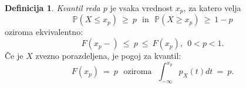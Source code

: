 \documentclass[11pt]{article}
\theoremstyle{definition}
\newtheorem{definicija}{Definicija}[section]
\theoremstyle{definition}
\theoremstyle{definition}
\begin{document}
\begin{definicija}

\textit{Kvantil reda $p$} je vsaka vrednost $x_p$, za katero velja
$$\mathbb{P}(X \leq x_p) ~\geq~ p ~~~\text{in}~~~ \mathbb{P}(X \geq x_p) ~\geq~ 1 - p$$
oziroma ekvivalentno:
$$F(x_p-) ~\leq~ p ~\leq~ F(x_p), ~~0 < p < 1.$$
Če je $X$ zvezno porazdeljena, je pogoj za kvantil:
$$F(x_p) ~=~ p ~~~\text{oziroma}~~~ \int_{-\infty}^{x_p} p_X(t) dt ~=~ p.$$

\end{definicija}
\vspace{0.5cm}

\end{document}

